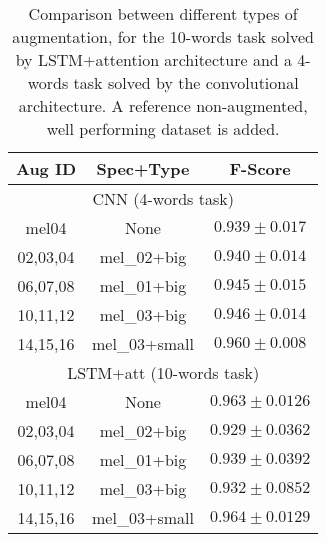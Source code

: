 \begin{table}[t!]
    \centering
    \caption{Comparison between different types of augmentation,
    for the 10-words task solved by LSTM+attention architecture and a
    4-words task solved by the convolutional architecture.
    A reference non-augmented, well performing dataset is added.}
    \label{tab:att_dataset_result_augmentation}
    \begin{tabular}{|cc|c|}
        \hline
        Aug ID & Spec+Type & F-Score \\
        \hline
        \hline
        \multicolumn{3}{|c|}{CNN (4-words task)} \\
        \hline
        mel04 & None & $0.939 \pm 0.017$ \\
        02,03,04 & mel\_02+big   & $0.940 \pm 0.014$ \\
        06,07,08 & mel\_01+big   & $0.945 \pm 0.015$ \\
        10,11,12 & mel\_03+big   & $0.946 \pm 0.014$ \\
        14,15,16 & mel\_03+small & $0.960 \pm 0.008$ \\
        \hline
        \hline
        \multicolumn{3}{|c|}{LSTM+att (10-words task)} \\
        \hline
        mel04   &  None & $0.963 \pm 0.0126$ \\
        02,03,04 & mel\_02+big   &  $0.929 \pm 0.0362$ \\
        06,07,08 & mel\_01+big   &  $0.939 \pm 0.0392$ \\
        10,11,12 & mel\_03+big   &  $0.932 \pm 0.0852$ \\
        14,15,16 & mel\_03+small &  $0.964 \pm 0.0129$ \\
        \hline
    \end{tabular}
\end{table}

